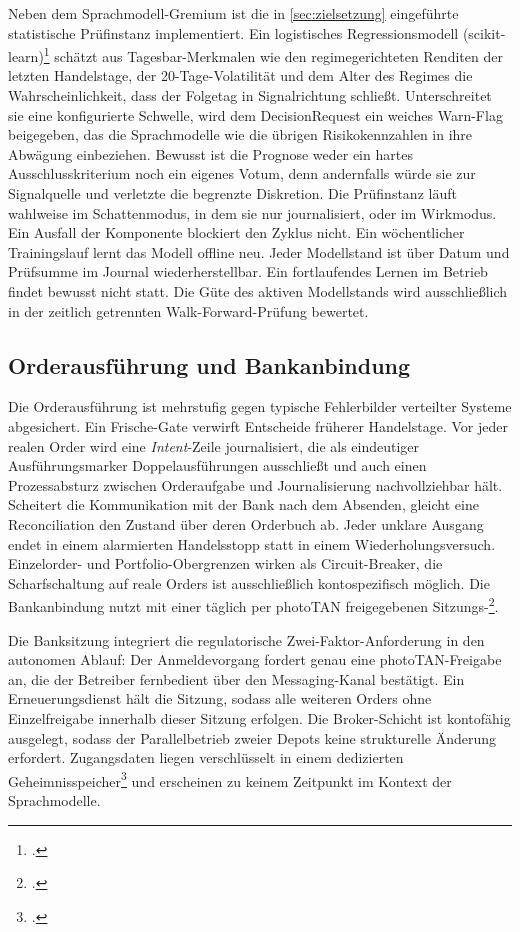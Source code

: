 Neben dem Sprachmodell-Gremium ist die in \cref{sec:zielsetzung} eingeführte statistische
Prüfinstanz implementiert. Ein logistisches Regressionsmodell
(scikit-learn)\footcites[vgl.][S.~2825--2830]{pedregosa2011}[vgl.][]{sklearnLogreg2026}
schätzt aus Tagesbar-Merkmalen wie den regimegerichteten Renditen der letzten Handelstage,
der 20-Tage-Volatilität und dem Alter des Regimes die Wahrscheinlichkeit, dass der Folgetag
in Signalrichtung schließt. Unterschreitet sie eine konfigurierte Schwelle, wird dem
DecisionRequest ein weiches Warn-Flag beigegeben, das die Sprachmodelle wie die übrigen
Risikokennzahlen in ihre Abwägung einbeziehen. Bewusst ist die Prognose weder ein hartes
Ausschlusskriterium noch ein eigenes Votum, denn andernfalls würde sie zur Signalquelle und
verletzte die begrenzte Diskretion. Die Prüfinstanz läuft wahlweise im Schattenmodus, in dem
sie nur journalisiert, oder im Wirkmodus. Ein Ausfall der Komponente blockiert den Zyklus
nicht. Ein wöchentlicher Trainingslauf lernt das Modell offline neu. Jeder Modellstand ist
über Datum und Prüfsumme im Journal wiederherstellbar. Ein fortlaufendes Lernen im Betrieb
findet bewusst nicht statt. Die Güte des aktiven Modellstands wird ausschließlich in der
zeitlich getrennten Walk-Forward-Prüfung bewertet.

\subsection{Orderausführung und Bankanbindung}
\label{sec:umsetzung-impl-order}

Die Orderausführung ist mehrstufig gegen typische Fehlerbilder verteilter Systeme
abgesichert. Ein Frische-Gate verwirft Entscheide früherer Handelstage. Vor jeder realen
Order wird eine \emph{Intent}-Zeile journalisiert, die als eindeutiger Ausführungsmarker
Doppelausführungen ausschließt und auch einen Prozessabsturz zwischen Orderaufgabe und
Journalisierung nachvollziehbar hält. Scheitert die Kommunikation mit der Bank nach dem
Absenden, gleicht eine Reconciliation den Zustand über deren Orderbuch ab. Jeder unklare
Ausgang endet in einem alarmierten Handelsstopp statt in einem Wiederholungsversuch.
Einzelorder- und Portfolio-Obergrenzen wirken als Circuit-Breaker, die Scharfschaltung auf
reale Orders ist ausschließlich kontospezifisch möglich. Die Bankanbindung nutzt
 mit einer täglich per photoTAN freigegebenen
Sitzungs-\footcite[vgl.][Kap.~2]{comdirectSpec2020}.

Die Banksitzung integriert die regulatorische Zwei-Faktor-Anforderung in den autonomen
Ablauf: Der Anmeldevorgang fordert genau eine photoTAN-Freigabe an, die der Betreiber
fernbedient über den Messaging-Kanal bestätigt. Ein Erneuerungsdienst hält die Sitzung,
sodass alle weiteren Orders ohne Einzelfreigabe innerhalb dieser Sitzung erfolgen. Die
Broker-Schicht ist kontofähig ausgelegt, sodass der Parallelbetrieb zweier Depots keine
strukturelle Änderung erfordert. Zugangsdaten liegen verschlüsselt in einem dedizierten
Geheimnisspeicher\footcite[vgl.][]{gcpSecret2026} und erscheinen zu keinem Zeitpunkt im
Kontext der Sprachmodelle.

